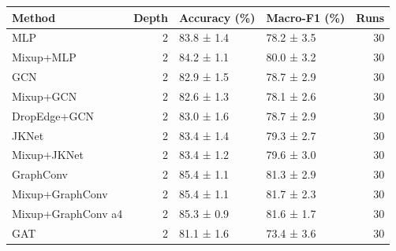 \begin{tabular}{lrllr}
\toprule
Method & Depth & Accuracy (\%) & Macro-F1 (\%) & Runs \\
\midrule
MLP & 2 & 83.8 ± 1.4 & 78.2 ± 3.5 & 30 \\
Mixup+MLP & 2 & 84.2 ± 1.1 & 80.0 ± 3.2 & 30 \\
GCN & 2 & 82.9 ± 1.5 & 78.7 ± 2.9 & 30 \\
Mixup+GCN & 2 & 82.6 ± 1.3 & 78.1 ± 2.6 & 30 \\
DropEdge+GCN & 2 & 83.0 ± 1.6 & 78.7 ± 2.9 & 30 \\
JKNet & 2 & 83.4 ± 1.4 & 79.3 ± 2.7 & 30 \\
Mixup+JKNet & 2 & 83.4 ± 1.2 & 79.6 ± 3.0 & 30 \\
GraphConv & 2 & 85.4 ± 1.1 & 81.3 ± 2.9 & 30 \\
Mixup+GraphConv & 2 & 85.4 ± 1.1 & 81.7 ± 2.3 & 30 \\
Mixup+GraphConv a4 & 2 & 85.3 ± 0.9 & 81.6 ± 1.7 & 30 \\
GAT & 2 & 81.1 ± 1.6 & 73.4 ± 3.6 & 30 \\
\bottomrule
\end{tabular}
